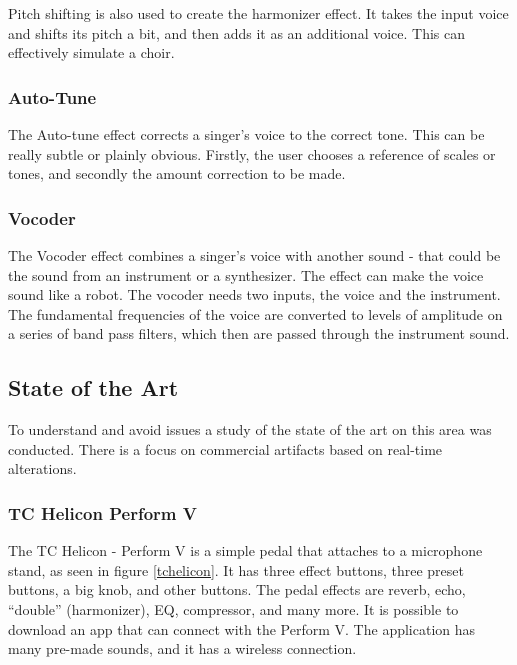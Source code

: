 Pitch shifting is also used to create the harmonizer effect. It takes the input voice and shifts its pitch a bit, and then adds it as an additional voice. This can effectively simulate a choir.

\subsubsection{Auto-Tune}

The Auto-tune effect corrects a singer's voice to the correct tone\citep{Hadhazy_2010}. This can be really subtle or plainly obvious. Firstly, the user chooses a reference of scales or tones, and secondly the amount correction to be made.

\subsubsection{Vocoder}

The Vocoder effect combines a singer's voice with another sound - that could be the sound from an instrument or a synthesizer\citep{Vocoder_00}. 
The effect can make the voice sound like a robot. The vocoder needs two inputs, the voice and the instrument. The fundamental frequencies of the voice are converted to levels of amplitude on a series of band pass filters, which then are passed through the instrument sound.

\subsection{State of the Art}
To understand and avoid issues a study of the state of the art on this area was conducted. There is a focus on commercial artifacts based on real-time alterations. 

\subsubsection{TC Helicon Perform V}

The TC Helicon - Perform V is a simple pedal that attaches to a microphone stand, as seen in figure \ref{tchelicon}\citep{TC}. It has three effect buttons, three preset buttons, a big knob, and other buttons. The pedal effects are reverb, echo, “double” (harmonizer), EQ, compressor, and many more. It is possible to download an app that can connect with the Perform V. The application has many pre-made sounds, and it has a wireless connection. \\


